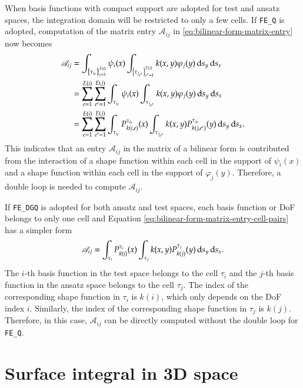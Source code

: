\documentclass[11pt, a4paper]{book}
\begin{document}
When basis functions with compact support are adopted for test and ansatz spaces, the
integration domain will be restricted to only a few cells. If \texttt{FE\_Q} is adopted,
computation of the matrix entry $\mathscr{A}_{ij}$ in
\eqref{eq:bilinear-form-matrix-entry} now becomes
\begin{equation}
  \label{eq:bilinear-form-matrix-entry-cell-pairs}
  \begin{aligned}
    \mathscr{A}_{ij} &= \int_{\left\{ \tau_{i_{e}} \right\}_{e=1}^{E(i)}} \psi_i(x)
    \int_{\left\{ \tau_{j_{e'}} \right\}_{e'=1}^{E(j)}} k(x,y)\varphi_j(y) \,\mathrm{d} s_y \,\mathrm{d}
    s_x \\
    &= \sum_{e=1}^{E(i)} \sum_{e'=1}^{E(j)} \int_{\tau_{i_e}} \psi_i(x)
  \int_{\tau_{j_{e'}}} k(x,y)\varphi_j(y) \,\mathrm{d} s_y \,\mathrm{d} s_x \\
    &= \sum_{e=1}^{E(i)} \sum_{e'=1}^{E(j)} \int_{\tau_{i_e}} P_{k(i,e)}^{\tau_{i_e}}(x)
  \int_{\tau_{j_{e'}}} k(x,y) P_{k(j,e')}^{\tau_{j_e}}(y) \,\mathrm{d} s_y \,\mathrm{d} s_x.
  \end{aligned}
\end{equation}
This indicates that an entry $\mathscr{A}_{ij}$ in the matrix of a bilinear form is
contributed from the interaction of a shape function within each cell in the support of
$\psi_i(x)$ and a shape function within each cell in the support of $\varphi_j(y)$.
Therefore, a double loop is needed to compute $\mathscr{A}_{ij}$.

If \texttt{FE\_DGQ} is adopted for both ansatz and test spaces, each basis function or DoF
belongs to only one cell and Equation \eqref{eq:bilinear-form-matrix-entry-cell-pairs} has a
simpler form
\begin{equation}
  \label{eq:bilinear-form-matrix-entry-cell-pairs-fedgq}
  \mathscr{A}_{ij} = \int_{\tau_i} P_{k(i)}^{\tau_i}(x)
  \int_{\tau_j} k(x,y) P_{k(j)}^{\tau_j}(y) \,\mathrm{d} s_y \,\mathrm{d} s_x.
\end{equation}
The $i$-th basis function in the test space belongs to the cell $\tau_i$ and the $j$-th
basis function in the ansatz space belongs to the cell $\tau_j$. The index of the
corresponding shape function in $\tau_i$ is $k(i)$, which only depends on the DoF index
$i$. Similarly, the index of the corresponding shape function in $\tau_j$ is $k(j)$.
Therefore, in this case, $\mathscr{A}_{ij}$ can be directly computed without the double
loop for \texttt{FE\_Q}.

\section{Surface integral in 3D space}
\end{document}
